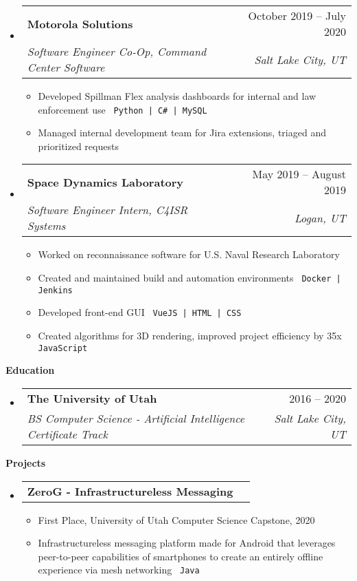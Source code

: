 \documentclass[letterpaper,12pt]{article}[leftmargin=*]
\makeatletter
\def \entryspacing {-0pt}
\renewcommand{\section}[2]{\vspace{5pt}
  \colorbox{secondary}{\color{white}\raggedbottom\normalsize\textbf{{#1}{\hspace{7pt}#2}}}
}
\newcommand{\resumeEntryStart}{\begin{itemize}[leftmargin=2.5mm]}
\newcommand{\resumeEntryEnd}{\end{itemize}\vspace{\entryspacing}}
\def\code#1{\texttt{#1}}
\newcommand{\resumeItemListStart}{\begin{itemize}[leftmargin=4.5mm]}
\newcommand{\resumeItemListEnd}{\end{itemize}}
\newcommand{\resumeItem}[1]{
  \item\small{
    {#1 \vspace{-2pt}}
  }
}
\newcommand{\resumeEntryTSDL}[4]{
  \vspace{-1pt}\item[]
    \begin{tabularx}{0.97\textwidth}{X@{\hspace{60pt}}r}
      \textbf{\color{primary}#1} & {\firabook\color{accent}\small#2} \\
      \textit{\color{accent}\small#3} & \textit{\color{accent}\small#4} \\
    \end{tabularx}\vspace{-6pt}
}
\newcommand{\resumeEntryTD}[2]{
  \vspace{-1pt}\item[]
    \begin{tabularx}{0.97\textwidth}{X@{\hspace{60pt}}r}
      \textbf{\color{primary}#1} & {\firabook\color{accent}\small#2} \\
    \end{tabularx}\vspace{-6pt}
}
\makeatother
\begin{document}
  \resumeEntryStart
    \resumeEntryTSDL
      {\faPager \hspace{3pt} Motorola Solutions}{October 2019 -- July 2020}
      {Software Engineer Co-Op, Command Center Software}{Salt Lake City, UT}
    \resumeItemListStart
      \resumeItem {Developed Spillman Flex analysis dashboards for internal and law enforcement use \code{  Python | C\# | MySQL}}
      \resumeItem {Managed internal development team for Jira extensions, triaged and prioritized requests}
    \resumeItemListEnd
  \resumeEntryEnd

  \resumeEntryStart
    \resumeEntryTSDL
      {\faSpaceShuttle \hspace{3pt} Space Dynamics Laboratory}{May 2019 -- August 2019}
      {Software Engineer Intern, C4ISR Systems}{Logan, UT}
    \resumeItemListStart
        \resumeItem {Worked on reconnaissance software for U.S. Naval Research Laboratory}
        \resumeItem {Created and maintained build and automation environments \code{ Docker | Jenkins}}
        \resumeItem {Developed front-end GUI \code{ VueJS | HTML | CSS}}
        \resumeItem {Created algorithms for 3D rendering, improved project efficiency by 35x \code{ JavaScript}}
    \resumeItemListEnd
  \resumeEntryEnd

\section{\faGraduationCap}{Education}

  \resumeEntryStart
    \resumeEntryTSDL
      {The University of Utah}{2016 -- 2020}
      {BS Computer Science - Artificial Intelligence Certificate Track}{Salt Lake City, UT}
  \resumeEntryEnd

\section{\faFlask}{Projects}

  \resumeEntryStart
    \resumeEntryTD
      {ZeroG - Infrastructureless Messaging}{}
    \resumeItemListStart
      \resumeItem {First Place, University of Utah Computer Science Capstone, 2020}
      \resumeItem {Infrastructureless messaging platform made for Android that leverages peer-to-peer capabilities of smartphones to create an entirely offline experience via mesh networking  \code{ Java}}
    \resumeItemListEnd
  \resumeEntryEnd
\end{document}
